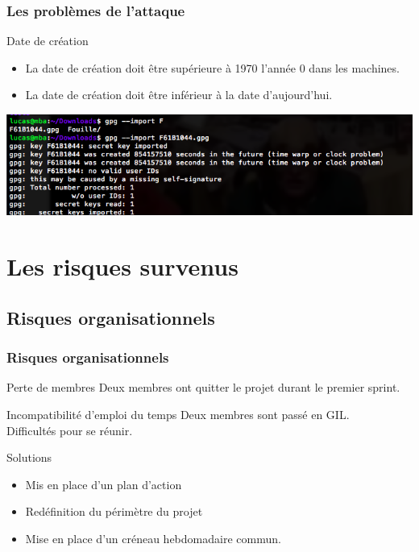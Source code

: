 \begin{frame}
  \frametitle{\color{white}Les problèmes de l'attaque}
  \begin{block}{Date de création}
      \begin{itemize}
        \item La date de création doit être supérieure à 1970 l'année 0 dans les machines.
        \item La date de création doit être inférieur à la date d'aujourd'hui.
      \end{itemize}
    \end{block}
    \medbreak
    \includegraphics[scale=0.42]{attaque.png}
\end{frame}


\section{Les risques survenus}
  \subsection{Risques organisationnels}
    \begin{frame}
      \frametitle{\color{white}Risques organisationnels}
      \begin{block}{Perte de membres}
        Deux membres ont quitter le projet durant le premier sprint.
      \end{block}
      \begin{block}{Incompatibilité d'emploi du temps}
        Deux membres sont passé en GIL.\\
        Difficultés pour se réunir.
      \end{block}
      \pause
      \begin{exampleblock}{Solutions}
        \begin{itemize}
          \item Mis en place d'un plan d'action
          \item Redéfinition du périmètre du projet
          \item Mise en place d'un créneau hebdomadaire commun.
        \end{itemize}
      \end{exampleblock}
    \end{frame}

